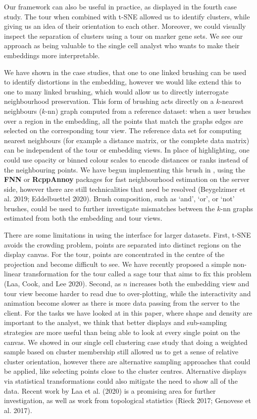 \documentclass[article,notitle]{jdssv}
\begin{document}
Our framework can also be useful in practice, as displayed
in the fourth case study. The tour when combined with t-SNE allowed us
to identify clusters, while giving us an idea of their orientation to
each other. Moreover, we could visually inspect the separation of clusters
using a tour on marker gene sets. We see our approach as being valuable
to the single cell analyst who wants to make their embeddings more
interpretable.

We have shown in the case studies, that one to one linked brushing can
be used to identify distortions in the embedding, however we would
like extend this to one to many linked brushing, which would allow us to directly interrogate neighbourhood preservation. This form of brushing acts directly on a \(k\)-nearest neighbours (\(k\)-nn) graph computed from a
reference dataset: when a user brushes over a region in the embedding,
all the points that match the graphs edges are selected on the
corresponding tour view. The reference data set for computing
nearest neighbours (for example a distance matrix, or the complete data matrix)
can be independent of the tour or embedding views. In place of
highlighting, one could use opacity or binned colour scales to encode
distances or ranks instead of the neighbouring points. We have begun
implementing this brush in , using the \textbf{FNN} or \textbf{RcppAnnoy}
packages for fast neighbourhood estimation on the server side, however there
are still technicalities that need be resolved (Beygelzimer et al. 2019; Eddelbuettel 2020).
Brush composition, such as `and', `or', or `not' brushes, could be used to
further investigate mismatches between the \(k\)-nn graphs estimated from both the embedding and tour views.

There are some limitations
in using the  interface for larger datasets. First,
t-SNE avoids the crowding problem, points are separated into distinct regions
on the display canvas. For the tour, points are concentrated in the
centre of the projection and become difficult to see. We have recently proposed a simple non-linear transformation for the tour called a sage tour that aims to fix this problem (Laa, Cook, and Lee 2020).
Second, as \(n\) increases both the embedding view and tour view become harder to read due to over-plotting, while the interactivity and animation become slower as there is more data passing from the server to the client.
For the tasks we have looked at in this paper, where shape and density are important to the analyst, we think that better displays and sub-sampling strategies are more useful than being able to look at every single point on the canvas. We showed in our single cell clustering case study that doing a weighted sample based on cluster membership still allowed us to get a sense of relative cluster orientation, however there are alternative sampling approaches that could be applied, like selecting points close to the cluster centres. Alternative displays via statistical transformations could also mitigate the need to show all of the data. Recent work
by Laa et al. (2020) is a promising area for further investigation, as well as
work from topological statistics (Rieck 2017; Genovese et al. 2017).
\end{document}
